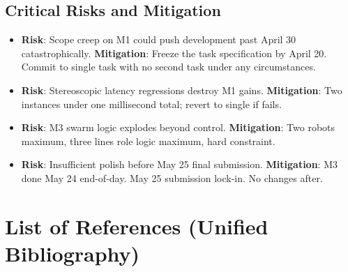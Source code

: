 ﻿\documentclass[11pt,a4paper]{article}
\begin{document}
\subsection{Critical Risks and Mitigation}

\begin{itemize}
  \item \textbf{Risk}: Scope creep on M1 could push development past April 30 catastrophically.  \textbf{Mitigation}: Freeze the task specification by April 20. Commit to single task with no second task under any circumstances.
  \item \textbf{Risk}: Stereoscopic latency regressions destroy M1 gains.  \textbf{Mitigation}: Two instances under one millisecond total; revert to single if fails.
  \item \textbf{Risk}: M3 swarm logic explodes beyond control.  \textbf{Mitigation}: Two robots maximum, three lines role logic maximum, hard constraint.
  \item \textbf{Risk}: Insufficient polish before May 25 final submission.  \textbf{Mitigation}: M3 done May 24 end-of-day. May 25 submission lock-in. No changes after.
\end{itemize}

\section{List of References (Unified Bibliography)}
\end{document}
